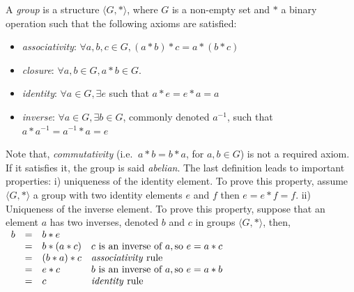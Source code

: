 \begin{definition}[Group]
 A \emph{group} is a structure $\langle G, * \rangle$, where $G$ is a non-empty set and $*$ a binary
 operation such that the following axioms are satisfied:
 \begin{itemize}[noitemsep,nolistsep]
  \item \emph{associativity}: $\forall a, b, c \in G, (a * b) * c = a * (b * c)$
  \item \emph{closure}: $\forall a, b \in G, a * b \in G$.
  \item \emph{identity}: $\forall a \in G, \exists e$ such that $ a * e = e * a = a$
  \item \emph{inverse}:  $\forall a \in G, \exists b \in G$, commonly denoted $a^{-1}$, such that
  $a * a^{-1} = a^{-1} * a = e$
 \end{itemize}
\end{definition}
Note that, \emph{commutativity} (i.e. $\ a * b = b * a$, for $a, b \in G$) is not a required axiom.
If it satisfies it, the group is said \emph{abelian}.
The last definition leads to important properties: i) uniqueness of the identity element. 
To prove this property, assume $\langle G, * \rangle$ a group with two identity elements $e$ and $f$ 
then $ e = e * f = f$.
ii) Uniqueness of the inverse element. To prove this property, suppose that an element $a$ has two inverses,
denoted $b$ and $c$ in groups $\langle G, * \rangle$, then,\\
 $\begin{array}{lcll}     
b & = & b * e & \\
& = & b * (a * c) & c \text{ is an inverse of } a, \text{so } e = a * c\\
& = & (b * a) * c &   \text{\emph{associativity} rule}\\
& = & e * c       & b \text{ is an inverse of } a, \text{so } e = a * b\\
& = & c           &   \text{\emph{identity} rule}
\end{array}$


